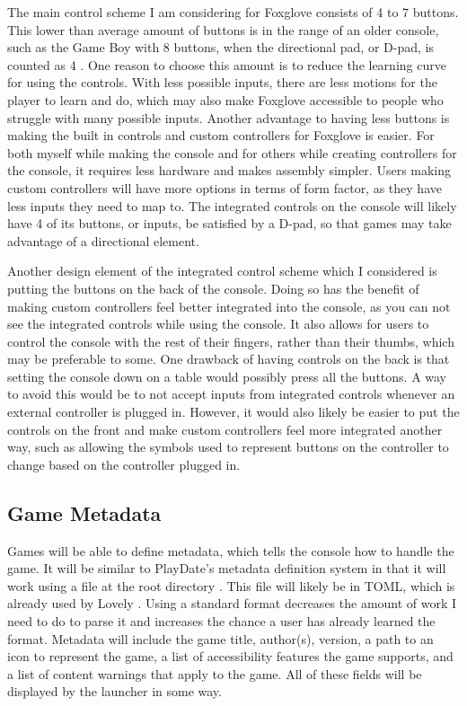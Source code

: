 \documentclass[10pt,twocolumn]{article}
\begin{document}
The main control scheme I am considering for
Foxglove consists of 4 to 7
buttons. This lower than average amount of buttons is in the range of an older
console, such as the Game Boy with 8 buttons,
when the directional pad, or D-pad,
is counted as 4 \cite{de_winkel_battery-free_2020}.
One reason to choose this amount is to
reduce the learning curve for using the controls. With less possible inputs,
there are less motions for the player to learn and do, which may also make
Foxglove accessible to people who struggle with many possible inputs.
Another
advantage to having less buttons is making the built in controls and custom
controllers for Foxglove is easier.
For both myself while making the console and
for others while creating controllers for the console, it requires less hardware
and makes assembly simpler. Users making custom controllers will have more
options in terms of form factor, as they have less inputs they need to map to.
The integrated controls on the console will likely have 4 of its buttons, or
inputs, be satisfied by a D-pad, so that games may take advantage of a
directional element.

Another design element of the integrated control scheme which I considered
is putting the buttons on the back of the console. Doing so has the benefit of
making custom controllers feel better integrated into the console, as you can
not see the integrated controls while using the console. It also allows for
users to control the console with the rest of their fingers, rather than
their thumbs, which may be preferable to some. One drawback of having controls
on the back is that setting the console down on a table would possibly press all
the buttons. A way to avoid this would be to not accept inputs from integrated
controls whenever an external controller is plugged in. However, it would also
likely be easier to put the controls on the front and make custom controllers
feel more integrated another way, such as allowing the symbols used to represent
buttons on the controller to change based on the controller plugged in.

\subsection{Game Metadata}

Games will be able to define metadata, which tells the console how to handle the
game. It will be similar to PlayDate's metadata definition system in that it
will work using a file at the root directory \cite{inc_inside_nodate}. This file
will likely be in TOML, which is already used by Lovely
\cite{green_ethangreen-devlovely-injector_2025}. Using a standard format
decreases the amount of work I need to do to parse it and increases the chance a
user has already learned the format. Metadata will include the game title,
author(s), version, a path to an icon to represent the game,
a list of accessibility features the game supports, and a list of content
warnings that apply to the game. All of these fields will be displayed by the
launcher in some way.
\end{document}
